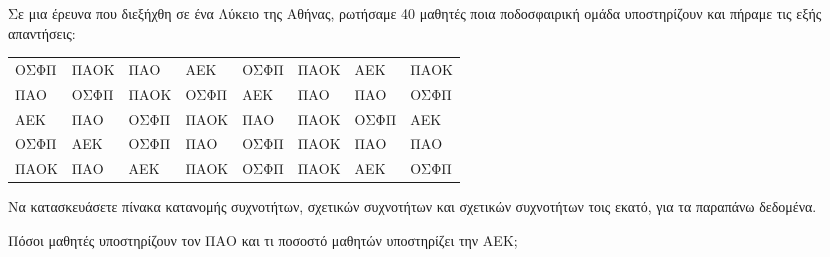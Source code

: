 Σε μια έρευνα που διεξήχθη σε ένα Λύκειο της Αθήνας, ρωτήσαμε 40 μαθητές ποια ποδοσφαιρική ομάδα υποστηρίζουν και πήραμε τις εξής απαντήσεις:\\
\begin{center}
\begin{tabular}{llllllll}
ΟΣΦΠ & ΠΑΟΚ & ΠΑΟ  & ΑΕΚ  & ΟΣΦΠ & ΠΑΟΚ & ΑΕΚ  & ΠΑΟΚ \\
ΠΑΟ  & ΟΣΦΠ & ΠΑΟΚ & ΟΣΦΠ & ΑΕΚ  & ΠΑΟ  & ΠΑΟ  & ΟΣΦΠ \\
ΑΕΚ  & ΠΑΟ  & ΟΣΦΠ & ΠΑΟΚ & ΠΑΟ  & ΠΑΟΚ & ΟΣΦΠ & ΑΕΚ  \\
ΟΣΦΠ & ΑΕΚ  & ΟΣΦΠ & ΠΑΟ  & ΟΣΦΠ & ΠΑΟΚ & ΠΑΟ  & ΠΑΟ  \\
ΠΑΟΚ & ΠΑΟ  & ΑΕΚ  & ΠΑΟΚ & ΟΣΦΠ & ΠΑΟΚ & ΑΕΚ  & ΟΣΦΠ
\end{tabular}
\end{center}
\begin{alist}
\item Να κατασκευάσετε πίνακα κατανομής συχνοτήτων, σχετικών συχνοτήτων και σχετικών συχνοτήτων τοις εκατό, για τα παραπάνω δεδομένα.
\item Πόσοι μαθητές υποστηρίζουν τον ΠΑΟ και τι ποσοστό μαθητών υποστηρίζει την ΑΕΚ;
\end{alist}
